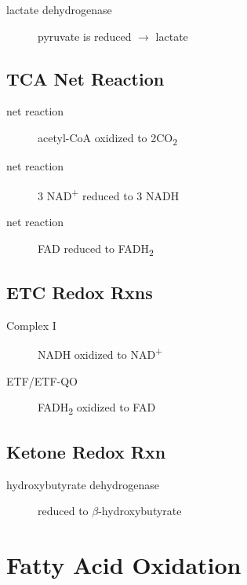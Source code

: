 \documentclass{scrartcl}
\begin{document}
\begin{description}
\item[{lactate dehydrogenase}] pyruvate is reduced \(\to\) lactate
\end{description}


\subsection{TCA Net Reaction}
\label{sec:org2f8f683}
\begin{description}
\item[{net reaction}] acetyl-CoA oxidized to 2CO\textsubscript{2}
\item[{net reaction}] 3 NAD\textsuperscript{+} reduced to 3 NADH
\item[{net reaction}] FAD reduced to FADH\textsubscript{2}
\end{description}
{\tiny{}}

\subsection{ETC Redox Rxns}
\label{sec:org0865cc2}
\begin{description}
\item[{Complex I}] NADH oxidized to NAD\textsuperscript{+}
\end{description}


\begin{description}
\item[{ETF/ETF-QO}] FADH\textsubscript{2} oxidized to FAD

\end{description}

\subsection{Ketone Redox Rxn}
\label{sec:orge768269}
\begin{description}
\item[{hydroxybutyrate dehydrogenase}] reduced to \(\beta\)-hydroxybutyrate

\end{description}

\section{Fatty Acid Oxidation}
\label{sec:org2cef654}
\end{document}
